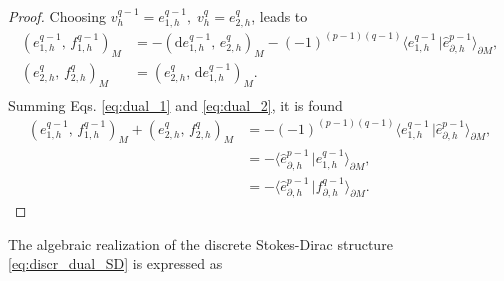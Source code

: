 \documentclass{elsarticle}
\renewcommand\d{\ensuremath{\mathrm{d}}}
\newcommand*{\dual}[1]{\ensuremath{\widehat{#1}}}
\newcommand{\inpr}[3][]{\ensuremath{( #2, \, #3 )_{#1}}}
\newcommand{\dualpr}[3][]{\ensuremath{\langle #2 \, \vert #3 \rangle_{#1}}}
\begin{document}
{\begin{proof}
Choosing ${v}^{q-1}_h = e^{q-1}_{1, h}, \; {v}^q_h = {e}^q_{2, h}$, leads to 
\begin{align}
      \inpr[M]{e^{q-1}_{1, h}}{{f}^{q-1}_{1, h}} &= -\inpr[M]{\d e^{q-1}_{1, h}}{{e}_{2, h}^q} - (-1)^{(p-1)(q-1)} \dualpr[\partial M]{e^{q-1}_{1, h}}{\dual{e}_{\partial, h}^{p-1}}, \label{eq:dual_1}\\
      \inpr[M]{{e}^q_{2, h}}{f^q_{2, h}} &= \inpr[M]{{e}^q_{2, h}}{\d e^{q-1}_{1, h}}.
      \label{eq:dual_2}\\
\end{align}
Summing Eqs. \eqref{eq:dual_1} and \eqref{eq:dual_2}, it is found 
\begin{equation}
\begin{aligned}
    \inpr[M]{e^{q-1}_{1, h}}{{f}^{q-1}_{1, h}} + \inpr[M]{{e}^q_{2, h}}{f^q_{2, h}} &= -(-1)^{(p-1)(q-1)} \dualpr[\partial M]{e^{q-1}_{1, h}}{\dual{e}_{\partial, h}^{p-1}}, \\
    &= -\dualpr[\partial M]{\dual{e}_{\partial, h}^{p-1}}{e^{q-1}_{1, h}}, \\ 
    &= -\dualpr[\partial M]{\dual{e}_{\partial, h}^{p-1}}{f_{\partial, h}^{q-1}}.
\end{aligned}
\end{equation}
\end{proof}

The algebraic realization of the discrete Stokes-Dirac structure \eqref{eq:discr_dual_SD} is expressed as

}
\end{document}
